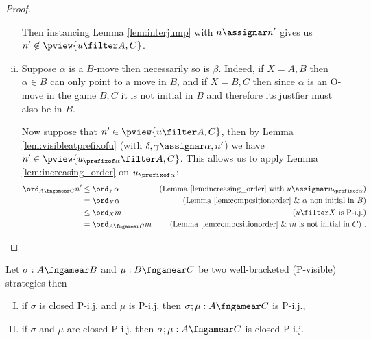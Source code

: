 \begin{proof}
\begin{enumerate}[i.]
Then instancing Lemma \ref{lem:interjump} with
$n \assignar n'$ gives us $n' \not\in\pview{u \filter A,C}$.

\item Suppose $\alpha$ is a $B$-move then necessarily so is $\beta$. Indeed, if $X=A,B$ then $\alpha \in B$
can only point to a move in $B$, and if $X=B,C$ then
since $\alpha$ is an O-move in the game $B,C$ it is not initial in $B$ and therefore its justfier must also be in $B$.

Now suppose that $n' \in \pview{u\filter A,C}$,
then by Lemma \ref{lem:visibleatprefixofu}
(with $\delta,\gamma \assignar \alpha,n'$)
we have $n' \in \pview{u_{\prefixof \alpha}\filter A,C}$. This allows us to apply Lemma \ref{lem:increasing_order} on $u_{\prefixof \alpha}$:
\begin{align*}
\ord_{A\fngamear C} n'
& \leq \ord_{Y} \alpha & \mbox{(Lemma \ref{lem:increasing_order} with $u\assignar u_{\prefixof \alpha}$)} \\
& = \ord_{X} \alpha & \mbox{(Lemma \ref{lem:compositionorder} \& $\alpha$ non initial in $B$)} \\
& \leq \ord_{X} m & \mbox{($u \filter X$ is P-i.j.)} \\
& = \ord_{A\fngamear C} m & \mbox{(Lemma \ref{lem:compositionorder} \& $m$ is not initial in $C$)} \ .
\end{align*}
\end{enumerate}
\end{proof}


\begin{proposition}
\label{prop:pijcompose_when_orda_geq_ordb}
Let $\sigma : A \fngamear B$ and $\mu : B \fngamear C$
be two well-bracketed (P-visible) strategies then
\begin{enumerate}[(I)]
\item if $\sigma$ is closed P-i.j. and $\mu$ is P-i.j.
then $\sigma ; \mu : A \fngamear C$ is P-i.j.,
\item if $\sigma$ and $\mu$ are closed P-i.j.
then $\sigma ; \mu : A \fngamear C$ is closed P-i.j.
\end{enumerate}
\end{proposition}

